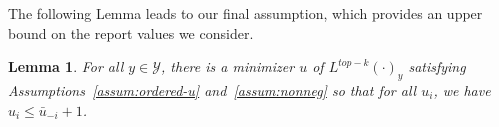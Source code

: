\documentclass[12pt]{article}
\newcommand{\Comments}{1}
\newcommand{\mynote}[2]{\ifnum\Comments=1\textcolor{#1}{#2}\fi}
\newcommand{\jessie}[1]{\mynote{purple}{[JF: #1]}}
\newcommand{\Y}{\mathcal{Y}}
\newtheorem{lemma}{Lemma}
\begin{document}

The following Lemma leads to our final assumption, which provides an upper bound on the report values we consider.

\begin{lemma}\label{lem:top-threshold}
	For all $y \in \Y$, there is a minimizer $u$ of $L^{top-k}(\cdot)_y$ satisfying Assumptions~\ref{assum:ordered-u} and~\ref{assum:nonneg} so that for all $u_i$, we have $u_i \leq \bar u_{-i} +1$. 
\end{lemma}
\end{document}
